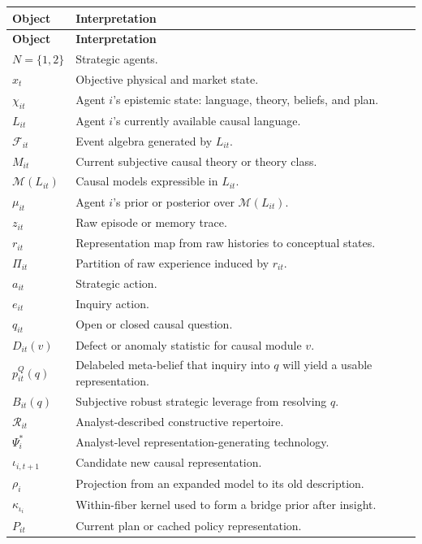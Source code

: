\documentclass[11pt]{article}
\newcommand{\M}{\mathcal{M}}
\newcommand{\F}{\mathcal{F}}
\newcommand{\R}{\mathcal{R}}
\begin{document}
	\begin{longtable}{@{}p{}p{}@{}}
		\toprule
		\textbf{Object} & \textbf{Interpretation} \\
		\midrule
		\endfirsthead
		\toprule
		\textbf{Object} & \textbf{Interpretation} \\
		\midrule
		\endhead
		$N=\{1,2\}$ & Strategic agents. \\
		$x_t$ & Objective physical and market state. \\
		$\chi_{it}$ & Agent $i$'s epistemic state: language, theory, beliefs, and plan. \\
		$L_{it}$ & Agent $i$'s currently available causal language. \\
		$\F_{it}$ & Event algebra generated by $L_{it}$. \\
		$M_{it}$ & Current subjective causal theory or theory class. \\
		$\M(L_{it})$ & Causal models expressible in $L_{it}$. \\
		$\mu_{it}$ & Agent $i$'s prior or posterior over $\M(L_{it})$. \\
		$z_{it}$ & Raw episode or memory trace. \\
		$r_{it}$ & Representation map from raw histories to conceptual states. \\
		$\Pi_{it}$ & Partition of raw experience induced by $r_{it}$. \\
		$a_{it}$ & Strategic action. \\
		$e_{it}$ & Inquiry action. \\
		$q_{it}$ & Open or closed causal question. \\
		$D_{it}(v)$ & Defect or anomaly statistic for causal module $v$. \\
		$p_{it}^{Q}(q)$ & Delabeled meta-belief that inquiry into $q$ will yield a usable representation. \\
		$B_{it}(q)$ & Subjective robust strategic leverage from resolving $q$. \\
		$\R_{it}$ & Analyst-described constructive repertoire. \\
		$\Psi_i^*$ & Analyst-level representation-generating technology. \\
		$\iota_{i,t+1}$ & Candidate new causal representation. \\
		$\rho_i$ & Projection from an expanded model to its old description. \\
		$\kappa_{\iota_i}$ & Within-fiber kernel used to form a bridge prior after insight. \\
		$P_{it}$ & Current plan or cached policy representation. \\
		\bottomrule
	\end{longtable}
	
\end{document}
